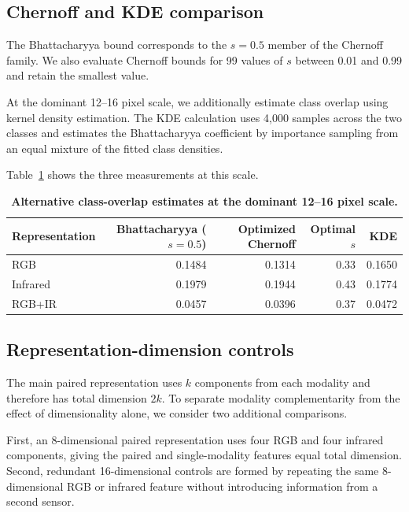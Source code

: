 \documentclass[10pt]{article}
\begin{document}
\subsection{Chernoff and KDE comparison}

The Bhattacharyya bound corresponds to the $s=0.5$ member of the Chernoff family. We also evaluate Chernoff bounds for 99 values of $s$ between 0.01 and 0.99 and retain the smallest value.

At the dominant 12--16 pixel scale, we additionally estimate class overlap using kernel density estimation. The KDE calculation uses 4,000 samples across the two classes and estimates the Bhattacharyya coefficient by importance sampling from an equal mixture of the fitted class densities.

Table~\ref{tab:crosschecks} shows the three measurements at this scale.

\begin{table}[h]
\centering
\caption{\textbf{Alternative class-overlap estimates at the dominant 12--16 pixel scale.}}
\label{tab:crosschecks}
\small
\begin{tabular}{lrrrr}
\toprule
Representation
& Bhattacharyya ($s=0.5$)
& Optimized Chernoff
& Optimal $s$
& KDE \\
\midrule
RGB
& 0.1484 & 0.1314 & 0.33 & 0.1650 \\
Infrared
& 0.1979 & 0.1944 & 0.43 & 0.1774 \\
RGB+IR
& 0.0457 & 0.0396 & 0.37 & 0.0472 \\
\bottomrule
\end{tabular}
\end{table}

\subsection{Representation-dimension controls}

The main paired representation uses $k$ components from each modality and therefore has total dimension $2k$. To separate modality complementarity from the effect of dimensionality alone, we consider two additional comparisons.

First, an 8-dimensional paired representation uses four RGB and four infrared components, giving the paired and single-modality features equal total dimension. Second, redundant 16-dimensional controls are formed by repeating the same 8-dimensional RGB or infrared feature without introducing information from a second sensor.
\end{document}
